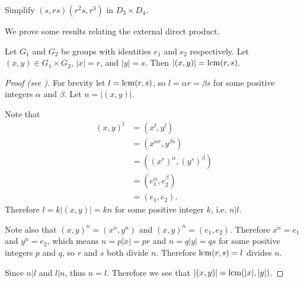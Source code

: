 \begin{exercise}
    Simplify $(s, rs)(r^2s, r^3)$ in $D_3 \times D_4$.
\end{exercise}

We prove some results relating the external direct product.
\begin{proposition}\label{prop-order-of-element-in-external-direct-product}
    Let $G_1$ and $G_2$ be groups with identities $e_1$ and $e_2$ respectively. Let $(x, y) \in G_1 \times G_2$, $|x| = r$, and $|y| = s$. Then $|(x, y)| = \mathrm{lcm}(r, s)$.
\end{proposition}
\begin{proof}[Proof (see \cite{proofwiki_order-of-group-element-in-external-direct-product})]
    For brevity let $l = \mathrm{lcm}(r, s)$, so $l = \alpha r = \beta s$ for some positive integers $\alpha$ and $\beta$. Let $n = |(x, y)|$.

    Note that
    \begin{align*}
        (x, y)^l &= (x^l, y^l)\\
        &= (x^{\alpha r}, y^{\beta s})\\
        &= \left((x^r)^\alpha, (y^s)^\beta\right)\\
        &= (e_1^\alpha, e_2^\beta)\\
        &= (e_1, e_2).
    \end{align*}
    Therefore $l = k|(x, y)| = kn$ for some positive integer $k$, i.e. $n \vert l$.

    Note also that $(x, y)^n = (x^n, y^n)$ and $(x, y)^n = (e_1, e_2)$. Therefore $x^n = e_1$ and $y^n = e_2$, which means $n = p|x| = pr$ and $n = q|y| = qs$ for some positive integers $p$ and $q$, so $r$ and $s$ both divide $n$. Therefore $\mathrm{lcm}(r, s) = l$ divides $n$.

    Since $n \vert l$ and $l \vert n$, thus $n = l$. Therefore we see that $|(x, y)| = \mathrm{lcm}(|x|, |y|)$.
\end{proof}


